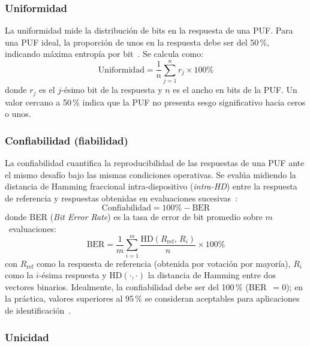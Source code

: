 \subsubsection{Uniformidad}

La uniformidad mide la distribución de bits en la respuesta de una PUF. Para
una PUF ideal, la proporción de unos en la respuesta debe ser del 50\,\%,
indicando máxima entropía por bit~\cite{maiti_2012_systematic}. Se calcula
como:
\begin{equation}
  \text{Uniformidad} = \frac{1}{n} \sum_{j=1}^{n} r_j \times 100\%
  \label{eq:uniformity}
\end{equation}
donde $r_j$ es el $j$-ésimo bit de la respuesta y $n$ es el ancho en bits de
la PUF. Un valor cercano a 50\,\% indica que la PUF no presenta sesgo
significativo hacia ceros o unos.

\subsubsection{Confiabilidad (fiabilidad)}

La confiabilidad cuantifica la reproducibilidad de las respuestas de una PUF
ante el mismo desafío bajo las mismas condiciones operativas. Se evalúa
midiendo la distancia de Hamming fraccional intra-dispositivo (\textit{intra-HD})
entre la respuesta de referencia y respuestas obtenidas en evaluaciones
sucesivas~\cite{maiti_2012_systematic}:
\begin{equation}
  \text{Confiabilidad} = 100\% - \text{BER}
  \label{eq:reliability}
\end{equation}
donde BER (\textit{Bit Error Rate}) es la tasa de error de bit promedio sobre
$m$~evaluaciones:
\begin{equation}
  \text{BER} = \frac{1}{m} \sum_{i=1}^{m}
    \frac{\text{HD}(R_{\text{ref}},\, R_i)}{n} \times 100\%
  \label{eq:ber}
\end{equation}
con $R_{\text{ref}}$ como la respuesta de referencia (obtenida por votación
por mayoría), $R_i$ como la $i$-ésima respuesta y $\text{HD}(\cdot,\cdot)$ la
distancia de Hamming entre dos vectores binarios. Idealmente, la
confiabilidad debe ser del 100\,\% (BER~$= 0$); en la práctica, valores
superiores al 95\,\% se consideran aceptables para aplicaciones de
identificación~\cite{hori_2011_pseudolfsr, maiti_2012_systematic}.

\subsubsection{Unicidad}

